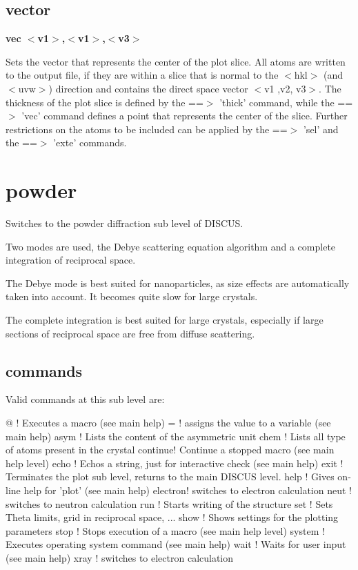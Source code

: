 \subsection*{vector}
{\bf vec $ <$v1$> $,$ <$v1$> $,$ <$v3$> $ \par }
\par
\vspace{3pt}
Sets the vector that represents the center of the plot slice. 
All atoms are written to the output file, if they are within a slice 
that is normal to the $ <$hkl$> $ (and $ <$uvw$> $) direction and contains the 
direct space vector $ <$v1 ,v2, v3$> $. The thickness of the plot 
slice is defined by the ==$> $ 'thick' command, while the ==$> $ 'vec' command 
defines a point that represents the center of the slice. 
Further restrictions on the atoms to be included can be applied by 
the ==$> $ 'sel' and the ==$> $ 'exte' commands. 
\section{powder}
\par
Switches to the powder diffraction sub level of DISCUS. 
\par
Two modes are used, the Debye scattering equation algorithm and a 
complete integration of reciprocal space. 
\par
The Debye mode is best suited for nanoparticles, as size effects 
are automatically taken into account. It becomes quite slow for 
large crystals. 
\par
The complete integration is best suited for large crystals, especially 
if large sections of reciprocal space are free from diffuse scattering. 
\par
\subsection*{commands}
Valid commands at this sub level are: 
\par
\begin{MacVerbatim}
@       ! Executes a macro (see main help)
=       ! assigns the value to a variable (see main help)
asym    ! Lists the content of the asymmetric unit
chem    ! Lists all type of atoms present in the crystal
continue! Continue a stopped macro (see main help level)
echo    ! Echos a string, just for interactive check (see main help)
exit    ! Terminates the plot sub level, returns to the main DISCUS level.
help    ! Gives on-line help for 'plot' (see main help)
electron! switches to electron calculation
neut    ! switches to neutron calculation
run     ! Starts writing of the structure
set     ! Sets Theta limits, grid in reciprocal space, ...
show    ! Shows settings for the plotting parameters
stop    ! Stops execution of a macro (see main help level)
system  ! Executes operating system command (see main help)
wait    ! Waits for user input (see main help)
xray    ! switches to electron calculation
\end{MacVerbatim}
